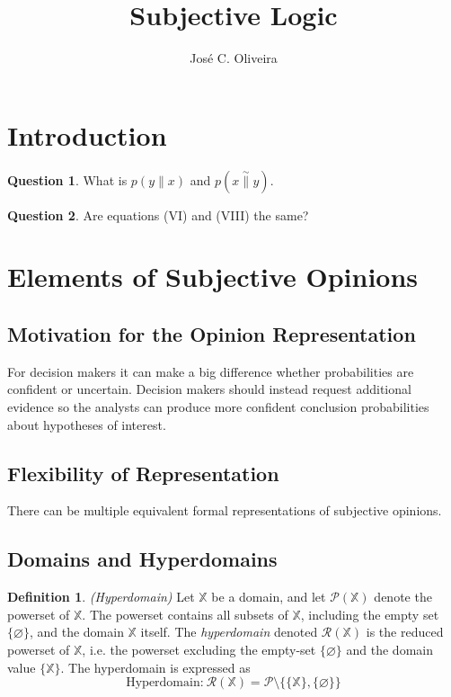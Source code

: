 \documentclass[a4paper,12pt]{article}
\title{Subjective Logic}
\author{José C. Oliveira}
\theoremstyle{definition}
\newtheorem{question}{Question}[section]
\newtheorem{definition}{Definition}[section]
\numberwithin{equation}{section}
\begin{document}
\maketitle

\tableofcontents

\section{Introduction}

\begin{question}
	What is $p(y \parallel x)$ and $p(x \overset{\sim}{\parallel} y)$.
\end{question}

\begin{question}
	Are equations (VI) and (VIII) the same?
\end{question}


\section{Elements of Subjective Opinions}

\subsection{Motivation for the Opinion Representation}

For decision makers it can make a big difference whether probabilities are confident or uncertain. Decision makers should instead request additional evidence so the analysts can produce more confident conclusion probabilities
about hypotheses of interest.

\subsection{Flexibility of Representation}

There can be multiple equivalent formal representations of subjective opinions.

\subsection{Domains and Hyperdomains}

\begin{definition}
	 \emph{(Hyperdomain)} Let $\mathbb{X}$ be a domain, and let $\mathcal{P}(\mathbb{X})$ denote the powerset of $\mathbb{X}$. The powerset contains all subsets of $\mathbb{X}$, including the empty set $\{\varnothing\}$, and the domain $\mathbb{X}$ itself. The \emph{hyperdomain} denoted $\mathcal{R}(\mathbb{X})$ is the reduced powerset of $\mathbb{X}$, i.e. the powerset excluding the empty-set $\{\varnothing\}$ and the domain value $\{\mathbb{X}\}$. The hyperdomain is expressed as
	\begin{equation}
		\text{Hyperdomain:}\ \mathcal{R}(\mathbb{X}) = \mathcal{P} \setminus \{\{\mathbb{X}\}, \{\varnothing\}\}
	\end{equation}
\end{definition}
\end{document}
